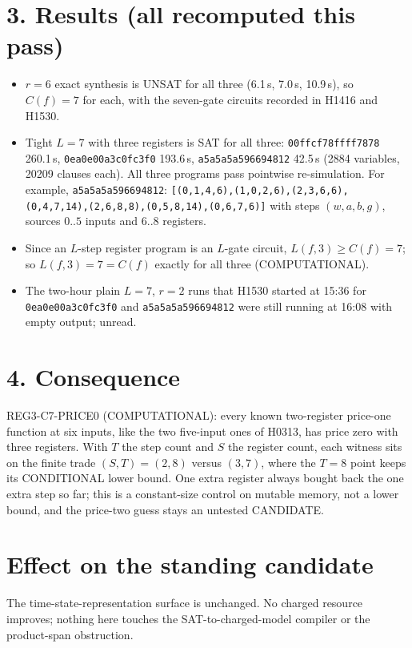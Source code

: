 \documentclass[11pt]{article}
\begin{document}
\section*{3. Results (all recomputed this pass)}
\begin{itemize}
\item $r=6$ exact synthesis is UNSAT for all three (6.1\,s, 7.0\,s, 10.9\,s), so $C(f)=7$ for each, with the seven-gate circuits recorded in H1416 and H1530.
\item Tight $L=7$ with three registers is SAT for all three: \texttt{00ffcf78ffff7878} 260.1\,s, \texttt{0ea0e00a3c0fc3f0} 193.6\,s, \texttt{a5a5a5a596694812} 42.5\,s (2884 variables, 20209 clauses each). All three programs pass pointwise re-simulation. For example, \texttt{a5a5a5a596694812}: \texttt{[(0,1,4,6),(1,0,2,6),(2,3,6,6),(0,4,7,14),(2,6,8,8),(0,5,8,14),(0,6,7,6)]} with steps $(w,a,b,g)$, sources $0..5$ inputs and $6..8$ registers.
\item Since an $L$-step register program is an $L$-gate circuit, $L(f,3)\ge C(f)=7$; so $L(f,3)=7=C(f)$ exactly for all three (COMPUTATIONAL).
\item The two-hour plain $L=7$, $r=2$ runs that H1530 started at 15:36 for \texttt{0ea0e00a3c0fc3f0} and \texttt{a5a5a5a596694812} were still running at 16:08 with empty output; unread.
\end{itemize}

\section*{4. Consequence}
REG3-C7-PRICE0 (COMPUTATIONAL): every known two-register price-one function at six inputs, like the two five-input ones of H0313, has price zero with three registers. With $T$ the step count and $S$ the register count, each witness sits on the finite trade $(S,T)=(2,8)$ versus $(3,7)$, where the $T=8$ point keeps its CONDITIONAL lower bound. One extra register always bought back the one extra step so far; this is a constant-size control on mutable memory, not a lower bound, and the price-two guess stays an untested CANDIDATE.

\section*{Effect on the standing candidate}
The time-state-representation surface is unchanged. No charged resource improves; nothing here touches the SAT-to-charged-model compiler or the product-span obstruction.
\end{document}

